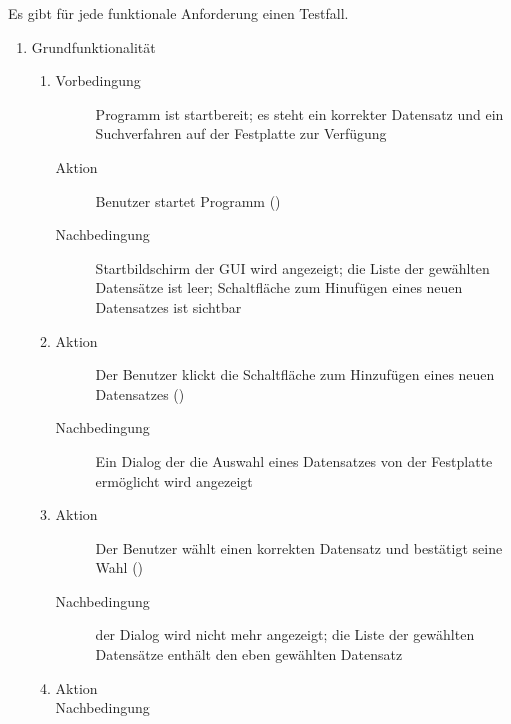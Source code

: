 	Es gibt für jede funktionale Anforderung einen Testfall.

\begin{enumerate} [label=\bfseries /TF \arabic*0/]
	\item Grundfunktionalität
	\begin{enumerate}
		\item
		\begin{description}
			\item[Vorbedingung] Programm ist startbereit; es steht ein korrekter Datensatz und ein Suchverfahren auf der Festplatte zur Verfügung
			\item[Aktion] Benutzer startet Programm ()
			\item[Nachbedingung] Startbildschirm der GUI wird angezeigt; die Liste der gewählten Datensätze ist leer; Schaltfläche zum Hinufügen eines neuen Datensatzes ist sichtbar
		\end{description}
		\item
		\begin{description}
			\item[Aktion] Der Benutzer klickt die Schaltfläche zum Hinzufügen eines neuen Datensatzes ()
			\item[Nachbedingung] Ein Dialog der die Auswahl eines Datensatzes von der Festplatte ermöglicht wird angezeigt
		\end{description}
		\item
		\begin{description}
			\item[Aktion] Der Benutzer wählt einen korrekten Datensatz und bestätigt seine Wahl ()
			\item[Nachbedingung] der Dialog wird nicht mehr angezeigt; die Liste der gewählten Datensätze enthält den eben gewählten Datensatz
		\end{description}
		\item
		\begin{description}
			\item[Aktion]
			\item[Nachbedingung]
		\end{description}
	\end{enumerate}


\end{enumerate}
